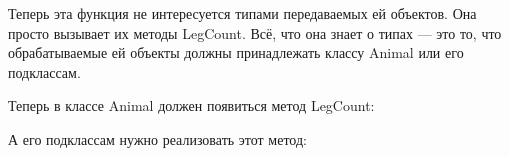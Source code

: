 \documentclass[a4paper]{article}
\begin{document}
Теперь эта функция не интересуется типами передаваемых ей объектов. Она просто вызывает их методы LegCount. Всё, что она знает о типах — это то, что обрабатываемые ей объекты должны принадлежать классу Animal или его подклассам.

Теперь в классе Animal должен появиться метод LegCount:

\begin{figure}[h]
\end{figure}

А его подклассам нужно реализовать этот метод:

\begin{figure}[h]
\end{figure}
\end{document}
